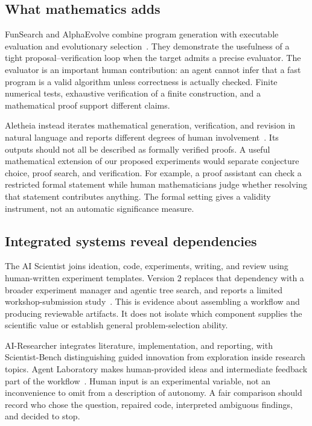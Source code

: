 \subsection{What mathematics adds}

FunSearch and AlphaEvolve combine program generation with executable evaluation and evolutionary selection~\cite{funsearch,alphaevolve}. They demonstrate the usefulness of a tight proposal--verification loop when the target admits a precise evaluator. The evaluator is an important human contribution: an agent cannot infer that a fast program is a valid algorithm unless correctness is actually checked. Finite numerical tests, exhaustive verification of a finite construction, and a mathematical proof support different claims.

Aletheia instead iterates mathematical generation, verification, and revision in natural language and reports different degrees of human involvement~\cite{aletheia}. Its outputs should not all be described as formally verified proofs. A useful mathematical extension of our proposed experiments would separate conjecture choice, proof search, and verification. For example, a proof assistant can check a restricted formal statement while human mathematicians judge whether resolving that statement contributes anything. The formal setting gives a validity instrument, not an automatic significance measure.

\subsection{Integrated systems reveal dependencies}

The AI Scientist joins ideation, code, experiments, writing, and review using human-written experiment templates. Version 2 replaces that dependency with a broader experiment manager and agentic tree search, and reports a limited workshop-submission study~\cite{ai-scientist,ai-scientist-v2}. This is evidence about assembling a workflow and producing reviewable artifacts. It does not isolate which component supplies the scientific value or establish general problem-selection ability.

AI-Researcher integrates literature, implementation, and reporting, with Scientist-Bench distinguishing guided innovation from exploration inside research topics. Agent Laboratory makes human-provided ideas and intermediate feedback part of the workflow~\cite{ai-researcher,agent-laboratory}. Human input is an experimental variable, not an inconvenience to omit from a description of autonomy. A fair comparison should record who chose the question, repaired code, interpreted ambiguous findings, and decided to stop.

